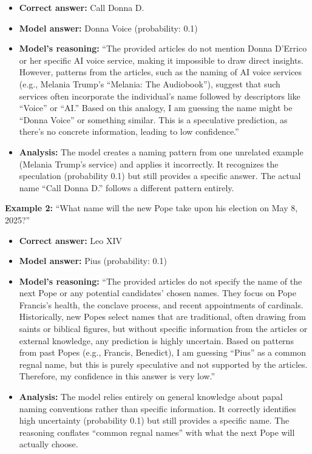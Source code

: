 \begin{itemize}
\item \textbf{Correct answer:} Call Donna D.
\item \textbf{Model answer:} Donna Voice (probability: 0.1)
\item \textbf{Model's reasoning:} ``The provided articles do not mention Donna D'Errico or her specific AI voice service, making it impossible to draw direct insights. However, patterns from the articles, such as the naming of AI voice services (e.g., Melania Trump's ``Melania: The Audiobook''), suggest that such services often incorporate the individual's name followed by descriptors like ``Voice'' or ``AI.'' Based on this analogy, I am guessing the name might be ``Donna Voice'' or something similar. This is a speculative prediction, as there's no concrete information, leading to low confidence.''
\item \textbf{Analysis:} The model creates a naming pattern from one unrelated example (Melania Trump's service) and applies it incorrectly. It recognizes the speculation (probability 0.1) but still provides a specific answer. The actual name ``Call Donna D.'' follows a different pattern entirely.
\end{itemize}

\textbf{Example 2:} ``What name will the new Pope take upon his election on May 8, 2025?''

\begin{itemize}
\item \textbf{Correct answer:} Leo XIV
\item \textbf{Model answer:} Pius (probability: 0.1)
\item \textbf{Model's reasoning:} ``The provided articles do not specify the name of the next Pope or any potential candidates' chosen names. They focus on Pope Francis's health, the conclave process, and recent appointments of cardinals. Historically, new Popes select names that are traditional, often drawing from saints or biblical figures, but without specific information from the articles or external knowledge, any prediction is highly uncertain. Based on patterns from past Popes (e.g., Francis, Benedict), I am guessing ``Pius'' as a common regnal name, but this is purely speculative and not supported by the articles. Therefore, my confidence in this answer is very low.''
\item \textbf{Analysis:} The model relies entirely on general knowledge about papal naming conventions rather than specific information. It correctly identifies high uncertainty (probability 0.1) but still provides a specific name. The reasoning conflates ``common regnal names'' with what the next Pope will actually choose.
\end{itemize}

